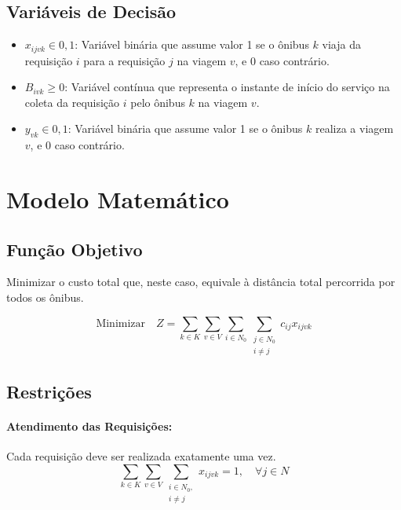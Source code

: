 \documentclass[12pt, a4paper]{article}
\begin{document}
\subsection{Variáveis de Decisão}

\begin{itemize}
    \item $x_{ijvk} \in {0, 1}$: Variável binária que assume valor 1 se o ônibus $k$ viaja da requisição $i$ para a requisição $j$ na viagem $v$, e 0 caso contrário.
    \item $B_{ivk} \ge 0$: Variável contínua que representa o instante de início do serviço na coleta da requisição $i$ pelo ônibus $k$ na viagem $v$.
    \item $y_{vk} \in {0, 1}$: Variável binária que assume valor 1 se o ônibus $k$ realiza a viagem $v$, e 0 caso contrário.
\end{itemize}

\section{Modelo Matemático}

\subsection{Função Objetivo}

Minimizar o custo total que, neste caso, equivale à distância total percorrida por todos os ônibus.

\begin{equation}
\text{Minimizar} \quad Z = \sum_{k \in K} \sum_{v \in V} \sum_{i \in N_0} \sum_{\substack{j \in N_0\\i \neq j}} c_{ij} x_{ijvk}
\end{equation}

\subsection{Restrições}

\paragraph{Atendimento das Requisições:} Cada requisição deve ser realizada exatamente uma vez.
\begin{equation}
\sum_{k \in K} \sum_{v \in V} \sum_{\substack{i \in N_0,\\i \neq j}} x_{ijvk} = 1, \quad \forall j \in N
\end{equation}
\end{document}

